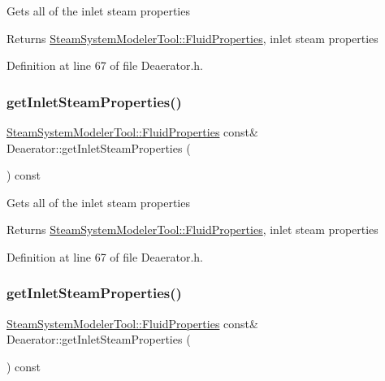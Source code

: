 Gets all of the inlet steam properties \begin{DoxyReturn}{Returns}
\hyperlink{struct_steam_system_modeler_tool_1_1_fluid_properties}{Steam\+System\+Modeler\+Tool\+::\+Fluid\+Properties}, inlet steam properties 
\end{DoxyReturn}


Definition at line 67 of file Deaerator.\+h.

\mbox{\label{class_deaerator_a7298fa1e4930e73dd5340411e8ccff33}} 
\subsubsection{\texorpdfstring{get\+Inlet\+Steam\+Properties()}{getInletSteamProperties()}\hspace{0.1cm}{\footnotesize\ttfamily [2/3]}}
{\footnotesize\ttfamily \hyperlink{struct_steam_system_modeler_tool_1_1_fluid_properties}{Steam\+System\+Modeler\+Tool\+::\+Fluid\+Properties} const\& Deaerator\+::get\+Inlet\+Steam\+Properties (\begin{DoxyParamCaption}{ }\end{DoxyParamCaption}) const\hspace{0.3cm}{\ttfamily [inline]}}

Gets all of the inlet steam properties \begin{DoxyReturn}{Returns}
\hyperlink{struct_steam_system_modeler_tool_1_1_fluid_properties}{Steam\+System\+Modeler\+Tool\+::\+Fluid\+Properties}, inlet steam properties 
\end{DoxyReturn}


Definition at line 67 of file Deaerator.\+h.

\mbox{\label{class_deaerator_a7298fa1e4930e73dd5340411e8ccff33}} 
\subsubsection{\texorpdfstring{get\+Inlet\+Steam\+Properties()}{getInletSteamProperties()}\hspace{0.1cm}{\footnotesize\ttfamily [3/3]}}
{\footnotesize\ttfamily \hyperlink{struct_steam_system_modeler_tool_1_1_fluid_properties}{Steam\+System\+Modeler\+Tool\+::\+Fluid\+Properties} const\& Deaerator\+::get\+Inlet\+Steam\+Properties (\begin{DoxyParamCaption}{ }\end{DoxyParamCaption}) const\hspace{0.3cm}{\ttfamily [inline]}}

